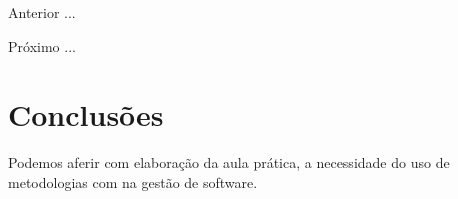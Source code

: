 \begin{asparaenum}
\item Anterior ...
\item Próximo ... \label{pl1}
\end{asparaenum}


\section{Conclusões}

\par Podemos aferir com elaboração da aula prática, a necessidade do uso de metodologias com na gestão de software.



